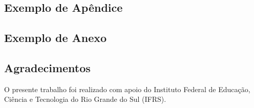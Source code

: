 \documentclass[
	article,			%
	12pt,				%
	oneside,			%
	a4paper,			%
	english,			%
	brazil,				%
	sumario=tradicional
]{abntex2}
\begin{document}
%
%


\begin{apendicesenv}
   \chapter{Exemplo de Apêndice}

   \lipsum[55-56]
\end{apendicesenv}


\begin{anexosenv}
   \chapter{Exemplo de Anexo}

   \lipsum[31]
\end{anexosenv}


\section*{Agradecimentos}
O presente trabalho foi realizado com apoio do Instituto Federal de Educação, Ciência e Tecnologia do Rio Grande do Sul (IFRS).
\end{document}
